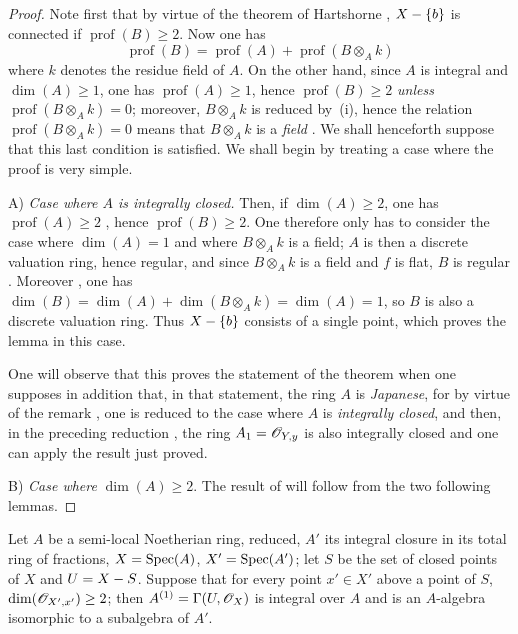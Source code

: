 \begin{proof}
Note first that by virtue of the theorem of Hartshorne , $X-\{b\}$ is connected if $\operatorname{prof}(B)\geq 2$.
Now one has 
\begin{equation}
  \operatorname{prof}(B)=\operatorname{prof}(A)+\operatorname{prof}(B\otimes_{A}k)
  \label{IV.18.9.7.4}
\tag{18.9.7.4}
\end{equation}
where $k$ denotes the residue field of $A$.
On the other hand, since $A$ is integral and $\dim(A)\geq 1$, one has $\operatorname{prof}(A)\geq 1$, hence $\operatorname{prof}(B)\geq 2$ \emph{unless} $\operatorname{prof}(B\otimes_{A}k)=0$;
moreover, $B\otimes_{A}k$ is reduced by~(i), hence the relation $\operatorname{prof}(B\otimes_{A}k)=0$ means that $B\otimes_{A}k$ is a \emph{field} .
We shall henceforth suppose that this last condition is satisfied.
We shall begin by treating a case where the proof is very simple.

A) \emph{Case where $A$ is integrally closed.}
Then, if $\dim(A)\geq 2$, one has $\operatorname{prof}(A)\geq 2$ , hence $\operatorname{prof}(B)\geq 2$.
One therefore only has to consider the case where $\dim(A)=1$ and where $B\otimes_{A}k$ is a field;
$A$ is then a discrete valuation ring, hence regular, and since $B\otimes_{A}k$
is a field and $f$ is flat, $B$ is regular .
Moreover , one has $\dim(B)=\dim(A)+\dim(B\otimes_{A}k)=\dim(A)=1$, so $B$ is also a discrete valuation ring.
Thus $X-\{b\}$ consists of a single point, which proves the lemma  in this case.

One will observe that this proves the statement of the theorem  when one supposes in addition that, in that statement, the ring $A$ is \emph{Japanese}, for by virtue of the remark , one is reduced to the case where $A$ is \emph{integrally closed}, and then, in the preceding reduction , the ring $A_1=\mathscr{O}_{Y,y}$ is also integrally closed and one can apply the result just proved.

B) \emph{Case where} $\dim(A)\geq 2$.
The result of  will follow from the two following lemmas.
\end{proof}

\begin{lemma}[18.9.7.5]
\label{IV.18.9.7.5}
Let $A$ be a semi-local Noetherian ring, reduced, $A'$ its integral closure in its total ring of fractions, $X=\operatorname{Spec}(A)$, $X'=\operatorname{Spec}(A')$;
let $S$ be the set of closed points of $X$ and $U=X- S$.
Suppose that for every point $x'\in X'$ above a point of $S$, $\dim(\mathscr{O}_{X',x'})\geq 2$;
then $A^{(1)}=\Gamma(U,\mathscr{O}_{X})$ is integral over $A$ and is an $A$-algebra isomorphic to a subalgebra of $A'$.
\end{lemma}


